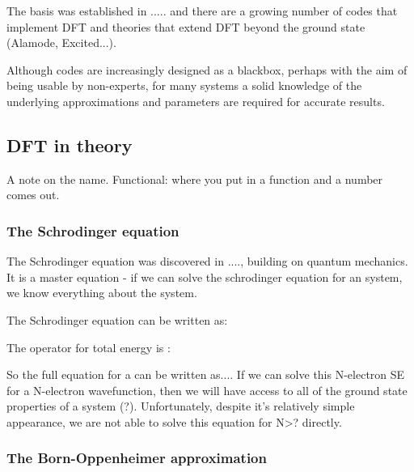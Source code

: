 The basis was established in ..... and there are a growing number of codes that implement DFT and theories that extend DFT beyond the ground state (Alamode, Excited...).

Although codes are increasingly designed as a blackbox, perhaps with the aim of being usable by non-experts, for many systems a solid knowledge of the underlying approximations and parameters are required for accurate results.
\subsection{DFT in theory}

A note on the name. Functional: where you put in a function and a number comes out.


\subsubsection{The Schrodinger equation}

The Schrodinger equation was discovered in ...., building on quantum mechanics. It is a master equation - if we can solve the schrodinger equation for an system, we know everything about the system.

The Schrodinger equation can be written as:

The operator for total energy is :


So the full equation for a can be written as....
If we can solve this N-electron SE for a N-electron wavefunction, then we will have access to all of the ground state properties of a system (?).
Unfortunately, despite it's relatively simple appearance, we are not able to solve this equation for N>? directly.






\subsubsection{The Born-Oppenheimer approximation}

